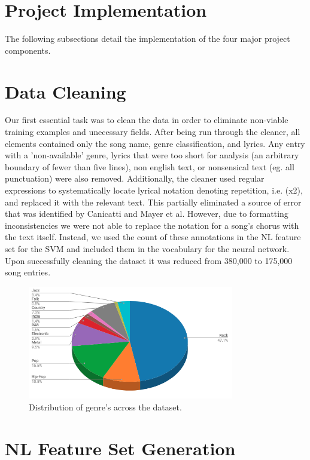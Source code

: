\documentclass[journal]{IEEEtran}
\begin{document}
\section{Project Implementation}
The following subsections detail the implementation of the four major project components. 

\section{Data Cleaning}

Our first essential task was to clean the data in order to eliminate non-viable training examples and unecessary fields. After being run through the cleaner, all elements contained only the song name, genre classification, and lyrics. Any entry with a 'non-available' genre, lyrics that were too short for analysis (an arbitrary boundary of fewer than five lines), non english text, or nonsensical text (eg. all punctuation) were also removed. Additionally, the cleaner used regular expressions to systematically locate lyrical notation denoting repetition, i.e. (x2), and replaced it with the relevant text. This partially eliminated a source of error that was identified by Canicatti and Mayer et al. However, due to formatting inconsistencies we were not able to replace the notation for a song's chorus with the text itself. Instead, we used the count of these annotations in the NL feature set for the SVM and included them in the vocabulary for the neural network. Upon successfully cleaning the dataset it was reduced from 380,000 to 175,000 song entries.

\begin{figure}[h]
\centering
\includegraphics[width=9cm]{Figure_1}
\caption{Distribution of genre's across the dataset.}
\end{figure}

\section{NL Feature Set Generation}
\end{document}
